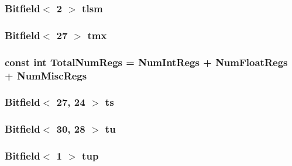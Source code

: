 \label{namespaceMipsISA_af1e97becf027069cbed0429d0daa8c48}
\hypertarget{namespaceMipsISA_a076c808954e2734286633bbd6ba90390}{
\subsubsection[{tlsm}]{\setlength{\rightskip}{0pt plus 5cm}Bitfield$<$ 2 $>$ {\bf tlsm}}}
\label{namespaceMipsISA_a076c808954e2734286633bbd6ba90390}
\hypertarget{namespaceMipsISA_a366e78a0dd88a5f2232e7a28257faae7}{
\subsubsection[{tmx}]{\setlength{\rightskip}{0pt plus 5cm}Bitfield$<$ 27 $>$ {\bf tmx}}}
\label{namespaceMipsISA_a366e78a0dd88a5f2232e7a28257faae7}
\hypertarget{namespaceMipsISA_a578a3508d56f10e933ba9559e2cf907c}{
\subsubsection[{TotalNumRegs}]{\setlength{\rightskip}{0pt plus 5cm}const int {\bf TotalNumRegs} = {\bf NumIntRegs} + {\bf NumFloatRegs} + {\bf NumMiscRegs}}}
\label{namespaceMipsISA_a578a3508d56f10e933ba9559e2cf907c}
\hypertarget{namespaceMipsISA_a50fc899bd84a44263a9de45feb70b447}{
\subsubsection[{ts}]{\setlength{\rightskip}{0pt plus 5cm}Bitfield$<$ 27, 24 $>$ {\bf ts}}}
\label{namespaceMipsISA_a50fc899bd84a44263a9de45feb70b447}
\hypertarget{namespaceMipsISA_a14755171c87cd0d1f3adc519f906784b}{
\subsubsection[{tu}]{\setlength{\rightskip}{0pt plus 5cm}Bitfield$<$ 30, 28 $>$ {\bf tu}}}
\label{namespaceMipsISA_a14755171c87cd0d1f3adc519f906784b}
\hypertarget{namespaceMipsISA_a03a5e2158a849bce2f5bbef022f4b9e0}{
\subsubsection[{tup}]{\setlength{\rightskip}{0pt plus 5cm}Bitfield$<$ 1 $>$ {\bf tup}}}
